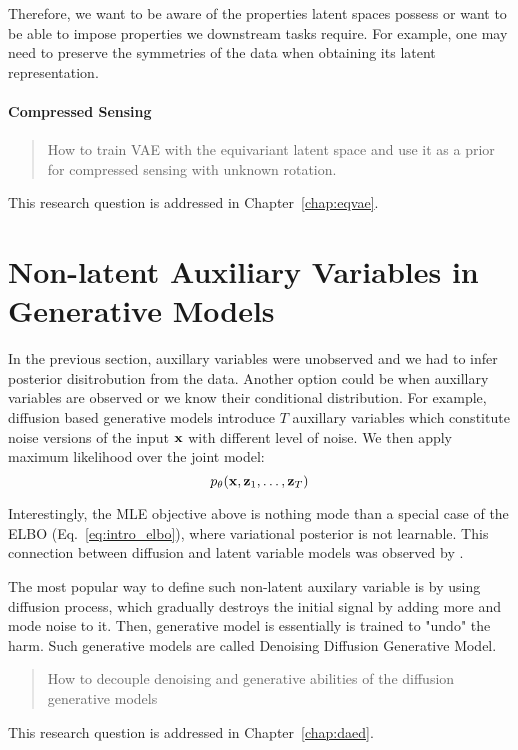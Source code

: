 Therefore, we want to be aware of the properties latent spaces possess or want to be able to impose properties we downstream tasks require. For example, one may need to preserve the symmetries of the data when obtaining its latent representation. 


\paragraph{Compressed Sensing}
\begin{quote}
	How  to train VAE with the equivariant latent space and use it as a prior for compressed sensing with unknown rotation.
\end{quote}
This research question is addressed in Chapter~\ref{chap:eqvae}.


\section{Non-latent Auxiliary Variables in Generative Models}
In the previous section, auxillary variables were unobserved and we had to infer posterior disitrobution from the data. Another option could be when auxillary variables are observed or we know their conditional distribution. For example, diffusion based generative models introduce $T$ auxillary variables which constitute noise versions of the input ${\mathbf{x}}$ with different level of noise. We then apply maximum likelihood over the joint model:
\begin{equation}
p_{\theta}({\mathbf{x}}, {\mathbf{z}}_1, \dots, {\mathbf{z}}_T)
\end{equation}

Interestingly, the MLE objective above is nothing mode than a special case of the ELBO (Eq.~\ref{eq:intro_elbo}), where variational posterior is not learnable. This connection between diffusion and latent variable models was observed by \citet{huang2021variational, kingma2021variational, tzen2019neural}.

The most popular way to define such non-latent auxilary variable is by using diffusion process, which gradually destroys the initial signal by adding more and mode noise to it. Then, generative model is essentially is trained to "undo" the harm. Such generative models are called Denoising Diffusion Generative Model.

\begin{quote}
	How  to decouple denoising and generative abilities of the diffusion generative models
\end{quote}
This research question is addressed in Chapter~\ref{chap:daed}.



